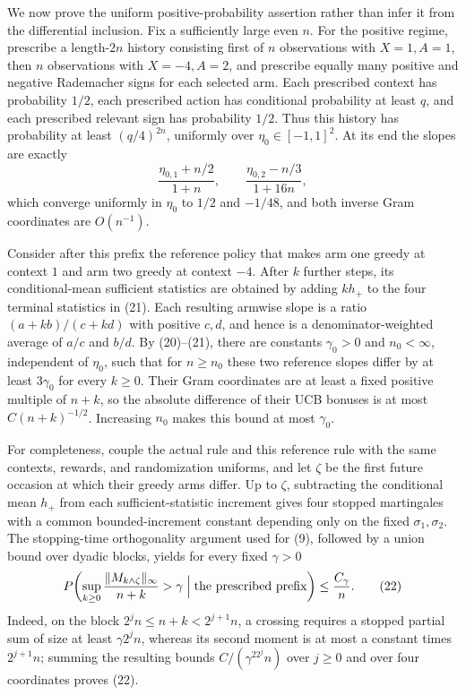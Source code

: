 We now prove the uniform positive-probability assertion rather than infer it from the differential inclusion.  Fix a sufficiently large even \(n\).  For the positive regime, prescribe a length-\(2n\) history consisting first of \(n\) observations with \(X=1,A=1\), then \(n\) observations with \(X=-4,A=2\), and prescribe equally many positive and negative Rademacher signs for each selected arm.  Each prescribed context has probability \(1/2\), each prescribed action has conditional probability at least \(q\), and each prescribed relevant sign has probability \(1/2\).  Thus this history has probability at least \((q/4)^{2n}\), uniformly over \(\eta_0\in[-1,1]^2\).  At its end the slopes are exactly
\[
 \frac{\eta_{0,1}+n/2}{1+n},\qquad
 \frac{\eta_{0,2}-n/3}{1+16n}, \tag{21}
\]
which converge uniformly in \(\eta_0\) to \(1/2\) and \(-1/48\), and both inverse Gram coordinates are \(O(n^{-1})\).

Consider after this prefix the reference policy that makes arm one greedy at context \(1\) and arm two greedy at context \(-4\).  After \(k\) further steps, its conditional-mean sufficient statistics are obtained by adding \(kh_+\) to the four terminal statistics in (21).  Each resulting armwise slope is a ratio \((a+kb)/(c+kd)\) with positive \(c,d\), and hence is a denominator-weighted average of \(a/c\) and \(b/d\).  By (20)--(21), there are constants \(\gamma_0>0\) and \(n_0<\infty\), independent of \(\eta_0\), such that for \(n\geq n_0\) these two reference slopes differ by at least \(3\gamma_0\) for every \(k\geq0\).  Their Gram coordinates are at least a fixed positive multiple of \(n+k\), so the absolute difference of their UCB bonuses is at most \(C(n+k)^{-1/2}\).  Increasing \(n_0\) makes this bound at most \(\gamma_0\).

For completeness, couple the actual rule and this reference rule with the same contexts, rewards, and randomization uniforms, and let \(\zeta\) be the first future occasion at which their greedy arms differ.  Up to \(\zeta\), subtracting the conditional mean \(h_+\) from each sufficient-statistic increment gives four stopped martingales with a common bounded-increment constant depending only on the fixed \(\sigma_1,\sigma_2\).  The stopping-time orthogonality argument used for (9), followed by a union bound over dyadic blocks, yields for every fixed \(\gamma>0\)
\[
 P\!\left(\sup_{k\geq0}\frac{\|M_{k\wedge\zeta}\|_\infty}{n+k}>\gamma
 \mathrel{\Big|}\hbox{the prescribed prefix}\right)
 \leq \frac{C_\gamma}{n}. \tag{22}
\]
Indeed, on the block \(2^jn\leq n+k<2^{j+1}n\), a crossing requires a stopped partial sum of size at least \(\gamma2^jn\), whereas its second moment is at most a constant times \(2^{j+1}n\); summing the resulting bounds \(C/(\gamma^22^jn)\) over \(j\geq0\) and over four coordinates proves (22).

